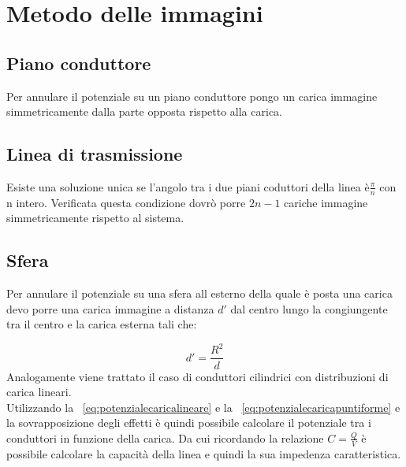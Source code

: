 \chapter{Metodo delle immagini}	


	\section{Piano conduttore}

	Per annulare il potenziale su un piano conduttore pongo un carica immagine simmetricamente dalla parte opposta rispetto alla carica.

	\section{Linea di trasmissione}

	Esiste una soluzione unica se l'angolo tra i due piani coduttori della linea è$\frac{\pi}{n}$ con n intero.
	Verificata questa condizione dovrò porre $2n-1$ cariche immagine simmetricamente rispetto al sistema.

	\section{Sfera}

	Per annulare il potenziale su una sfera all esterno della quale è posta una carica devo porre una carica immagine a distanza $d'$ dal centro lungo la congiungente tra il centro e la carica esterna tali che:

	\begin{equation}
	d'=\frac{R^2}{d}
	\end{equation}
	Analogamente viene trattato il caso di conduttori cilindrici con distribuzioni di carica lineari.
	\\

	Utilizzando la ~\ref{eq:potenzialecaricalineare} e la ~\ref{eq:potenzialecaricapuntiforme} e la sovrapposizione degli effetti è quindi possibile calcolare il potenziale tra i conduttori in funzione della carica. Da cui ricordando la relazione $C=\frac{Q}{V}$ è possibile calcolare la capacità della linea e quindi la sua impedenza caratteristica.